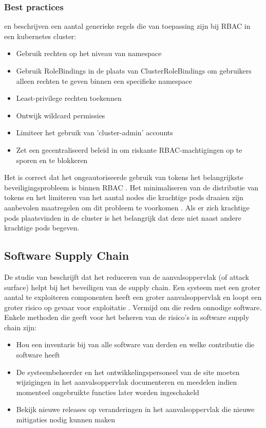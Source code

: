 \subsubsection{Best practices}
\textcite{KubernetesDocs-2023} en \textcite{OWASP-2023} beschrijven een aantal generieke regels die van toepassing zijn bij RBAC in een kubernetes cluster:
\begin{itemize}
    \item Gebruik rechten op het niveau van namespace
    \item Gebruik RoleBindings in de plaats van ClusterRoleBindings om gebruikers alleen rechten te geven binnen een specifieke namespace
    \item Least-privilege rechten toekennen
    \item Ontwijk wildcard permissies
    \item Limiteer het gebruik van 'cluster-admin' accounts
    \item Zet een gecentraliseerd beleid in om riskante RBAC-machtigingen op te sporen en te blokkeren
\end{itemize}

Het is correct dat het ongeautoriseerde gebruik van tokens het belangrijkste beveiligingsprobleem is binnen RBAC \autocite{nordell2022systematic}. Het minimaliseren van de distributie van tokens en het limiteren van het aantal nodes die krachtige pods draaien zijn aanbevolen maatregelen om dit probleem te voorkomen \autocite{KubernetesDocs-2023}. Als er zich krachtige pods plaatsvinden in de cluster is het belangrijk dat deze niet naast andere krachtige pods begeven. 

\subsection{Software Supply Chain}
De studie van \textcite{ellison2010evaluating} beschrijft dat het reduceren van de aanvalsoppervlak (of attack surface) helpt bij het beveiligen van de supply chain. Een systeem met een groter aantal te exploiteren componenten heeft een groter aanvalsoppervlak en loopt een groter risico op gevaar voor exploitatie \autocite{ellison2010evaluating}. Vermijd om die reden onnodige software. Enkele methoden die \textcite{ellison2010evaluating} geeft voor het beheren van de risico's in software supply chain zijn:
\begin{itemize}
    \item Hou een inventaris bij van alle software van derden en welke contributie die software heeft
    \item De systeembeheerder en het ontwikkelingspersoneel van de site moeten wijzigingen in het aanvalsoppervlak documenteren en meedelen indien momenteel ongebruikte functies later worden ingeschakeld
    \item Bekijk nieuwe releases op veranderingen in het aanvalsoppervlak die nieuwe mitigaties nodig kunnen maken
\end{itemize}

